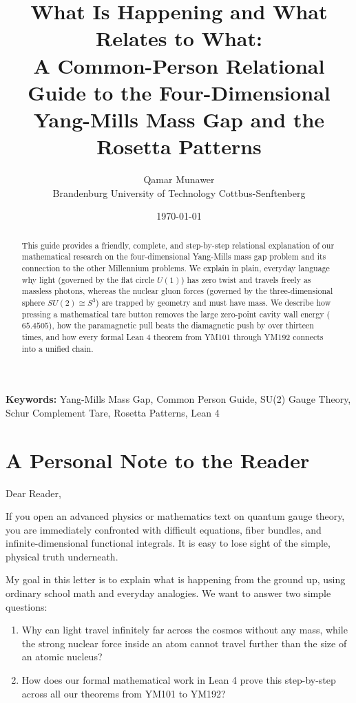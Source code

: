 \documentclass[11pt,a4paper]{article}
\title{\textbf{What Is Happening and What Relates to What:\\A Common-Person Relational Guide to the Four-Dimensional Yang-Mills Mass Gap and the Rosetta Patterns}}
\author{Qamar Munawer \\ Brandenburg University of Technology Cottbus-Senftenberg}
\date{\today}
\theoremstyle{definition}
\begin{document}
\maketitle

\begin{abstract}
This guide provides a friendly, complete, and step-by-step relational explanation of our mathematical research on the four-dimensional Yang-Mills mass gap problem and its connection to the other Millennium problems. We explain in plain, everyday language why light (governed by the flat circle $U(1)$) has zero twist and travels freely as massless photons, whereas the nuclear gluon forces (governed by the three-dimensional sphere $SU(2) \cong S^3$) are trapped by geometry and must have mass. We describe how pressing a mathematical tare button removes the large zero-point cavity wall energy ($65.4505$), how the paramagnetic pull beats the diamagnetic push by over thirteen times, and how every formal Lean 4 theorem from YM101 through YM192 connects into a unified chain.
\end{abstract}

\vspace{1em}
\noindent\textbf{Keywords:} Yang-Mills Mass Gap, Common Person Guide, SU(2) Gauge Theory, Schur Complement Tare, Rosetta Patterns, Lean 4

\section{A Personal Note to the Reader}

Dear Reader,

If you open an advanced physics or mathematics text on quantum gauge theory, you are immediately confronted with difficult equations, fiber bundles, and infinite-dimensional functional integrals. It is easy to lose sight of the simple, physical truth underneath.

My goal in this letter is to explain what is happening from the ground up, using ordinary school math and everyday analogies. We want to answer two simple questions:
\begin{enumerate}
  \item Why can light travel infinitely far across the cosmos without any mass, while the strong nuclear force inside an atom cannot travel further than the size of an atomic nucleus?
  \item How does our formal mathematical work in Lean 4 prove this step-by-step across all our theorems from YM101 to YM192?
\end{enumerate}
\end{document}
